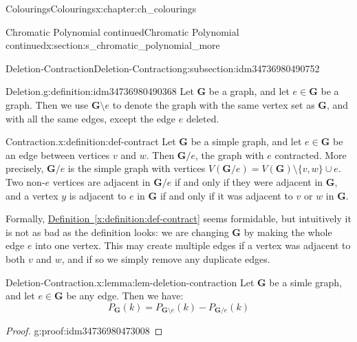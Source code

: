 \documentclass[oneside,10pt,]{book}
\newcommand{\xreffont}{\relax}
\numberwithin{equation}{section}
\newcommand{\bfG}{\mathbf{G}}
\begin{document}
\begin{chapterptx}{Colourings}{}{Colourings}{}{}{x:chapter:ch_colourings}
\begin{sectionptx}{Chromatic Polynomial continued}{}{Chromatic Polynomial continued}{}{}{x:section:s_chromatic_polynomial_more}
\begin{introduction}{}
\end{introduction}%
%
%
\typeout{************************************************}
\typeout{************************************************}
%
\begin{subsectionptx}{Deletion-Contraction}{}{Deletion-Contraction}{}{}{g:subsection:idm34736980490752}
\begin{definition}{Deletion.}{g:definition:idm34736980490368}%
Let \(\bfG\) be a graph, and let \(e\in\bfG\) be a graph.  Then we use \(\bfG\setminus e\) to denote the graph with the same vertex set as \(\bfG\), and with all the same edges, except the edge \(e\) deleted.%
\end{definition}
\begin{definition}{Contraction.}{x:definition:def-contract}%
Let \(\bfG\) be a simple graph, and let \(e\in \bfG\) be an edge between vertices \(v\) and \(w\).  Then \(\bfG/e\), the graph with \(e\) contracted.  More precisely, \(\bfG/e\) is the simple graph with vertices \(V(\bfG/e)=V(\bfG)\setminus \{v,w\}\cup {e}\).  Two non-\(e\) vertices are adjacent in \(\bfG/e\) if and only if they were adjacent in \(\bfG\), and a vertex \(y\) is adjacent to \(e\) in \(\bfG\) if and only if it was adjacent to \(v\) or \(w\) in \(\bfG\).%
\end{definition}
Formally, \hyperref[x:definition:def-contract]{Definition~{\xreffont\ref{x:definition:def-contract}}} seems formidable, but intuitively it is not as bad as the definition looks: we are changing \(\bfG\) by making the whole edge \(e\) into one vertex.  This may create multiple edges if a vertex was adjacent to both \(v\) and \(w\), and if so we simply remove any duplicate edges.%
\begin{lemma}{Deletion-Contraction.}{}{x:lemma:lem-deletion-contraction}%
Let \(\bfG\) be a simle graph, and let \(e\in \bfG\) be any edge.  Then we have:%
%
\begin{equation*}
P_\bfG(k)=P_{\bfG\setminus e}(k)-P_{\bfG/e}(k)
\end{equation*}
\end{lemma}
\begin{proof}{}{g:proof:idm34736980473008}

\end{proof}
\end{subsectionptx}
\end{sectionptx}
\end{chapterptx}
\end{document}
